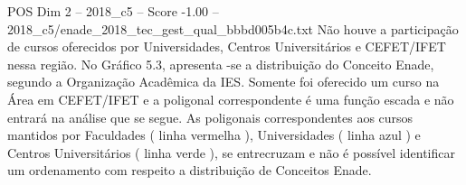 \begin{textsample}{POS Dim 2 – 2018\_c5 – Score -1.00 – 2018\_c5/enade\_2018\_tec\_gest\_qual\_bbbd005b4c.txt}
Não houve a participação de cursos oferecidos por Universidades, Centros Universitários e CEFET/IFET nessa região.
No Gráfico 5.3, apresenta -se a distribuição do Conceito Enade, segundo a Organização Acadêmica da IES.
Somente foi oferecido um curso na Área em CEFET/IFET e a poligonal correspondente é uma função escada e não entrará na análise que se segue.
As poligonais correspondentes aos cursos mantidos por Faculdades ( linha vermelha ), Universidades ( linha azul ) e Centros Universitários ( linha verde ), se entrecruzam e não é possível identificar um ordenamento com respeito a distribuição de Conceitos Enade.

\end{textsample}
